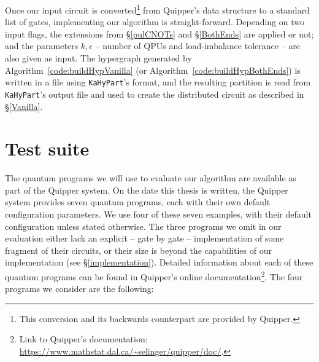Once our input circuit is converted\footnote{This conversion and its backwards counterpart are provided by Quipper.} from Quipper's data structure to a standard list of gates, implementing our algorithm is straight-forward. Depending on two input flags, the extensions from \S\ref{pulCNOTs} and \S\ref{BothEnds} are applied or not; and the parameters \(k,\epsilon\) -- number of QPUs and load-imbalance tolerance -- are also given as input. The hypergraph generated by Algorithm~\ref{code:buildHypVanilla} (or Algorithm~\ref{code:buildHypBothEnds}) is written in a file using \texttt{KaHyPart}'s format, and the resulting partition is read from \texttt{KaHyPart}'s output file and used to create the distributed circuit as described in \S\ref{Vanilla}.


\section{Test suite}
\label{benchmark}

The quantum programs we will use to evaluate our algorithm are available as part of the Quipper system. On the date this thesis is written, the Quipper system provides seven quantum programs, each with their own default configuration parameters. We use four of these seven examples, with their default configuration unless stated otherwise. The three programs we omit in our evaluation either lack an explicit -- gate by gate -- implementation of some fragment of their circuits, or their size is beyond the capabilities of our implementation (see \S\ref{implementation}). Detailed information about each of these quantum programs can be found in Quipper's online documentation\footnote{Link to Quipper's documentation: \url{https://www.mathstat.dal.ca/~selinger/quipper/doc/}.}. The four programs we consider are the following:


